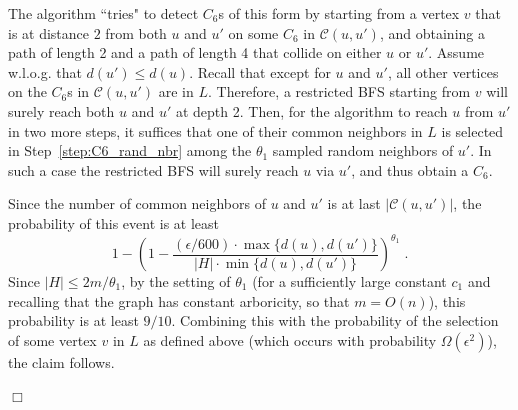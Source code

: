 \documentclass{article}
\newcommand{\eps}{\epsilon}
\newcommand{\calC}{{\mathcal{C}}}
\newenvironment{proof}{\smallskip\noindent{\bf Proof:}}%
        {\hspace*{\fill}$\Box$\par}
\newcommand{\commentt}[1]{ {}}
\begin{document}
\begin{proof}
The algorithm ``tries" to detect $C_6$s of this form by starting from a vertex $v$ that is at distance $2$ from both $u$ and $u'$ on some $C_6$ in $\calC(u,u')$, and 
obtaining a path of length 2 and a path of length 4 that collide on either $u$ or $u'$. Assume w.l.o.g. that $d(u')\leq d(u)$. 
Recall that except for $u$ and $u'$, all other vertices on the $C_6$s in $\calC(u,u')$ are in $L$. Therefore, a restricted BFS starting from $v$ will surely reach both $u$ and $u'$ at depth 2. Then, for the algorithm to reach $u$ from  $u'$ in two more steps, it suffices that one of their common neighbors in $L$ is selected in Step~\ref{step:C6_rand_nbr} among the $\theta_1$ sampled random neighbors of $u'$. In such a case the restricted BFS will surely reach $u$  via $u'$,   and thus obtain a $C_6$.

Since the number of common neighbors of $u$ and $u'$ is at last $|\calC(u,u')|$,
the probability of this event is at least 
$$1-\left(1-\frac{(\eps/600)\cdot \max\{d(u),d(u')\}}{|H|\cdot \min\{d(u),d(u')\}}\right)^{\theta_1}\;.$$
Since $|H| \leq 2m/\theta_1$, by the setting of $\theta_1$ (for a sufficiently large constant $c_1$ and recalling that the graph has constant arboricity, so that $m=O(n)$), this probability is at least $9/10$. Combining this with the probability of the selection of some vertex $v$ in $L$ as defined above (which occurs with probability $\Omega(\eps^2)$), the claim follows. 

\end{proof}
\end{document}
